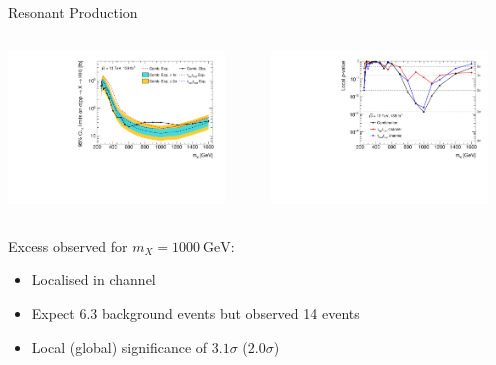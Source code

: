 \documentclass[11pt, xcolor={dvipsnames}, aspectratio=169]{beamer}
\begin{document}
\begin{frame}{Resonant \allbold{\HH} Production}
  \vspace*{0.1em}
  \begin{columns}[onlytextwidth]
    \centering

    \includegraphics[width=0.9\textwidth]{results_res/resonant_upper_limits}

    \centering

    \includegraphics[width=0.9\textwidth]{results_res/resonant_comb_pvalues}
  \end{columns}

  Excess observed for $m_{X} = \SI{1000}{\GeV}$:
  \begin{itemize}
  \item Localised in \hadhad channel
  \item Expect 6.3 background events but observed 14 events
  \item Local (global) significance of $3.1\sigma$ ($2.0\sigma$)
  \end{itemize}


\end{frame}
\end{document}
